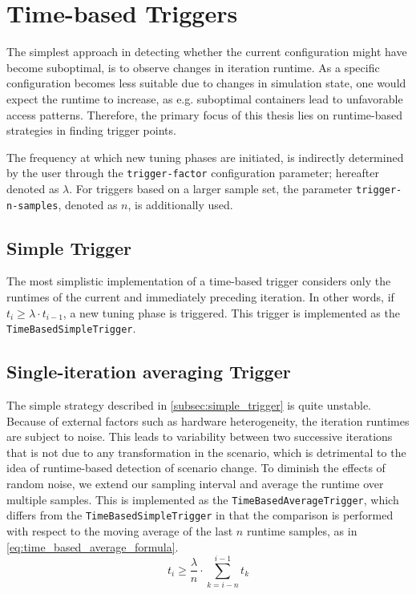 \section{Time-based Triggers}
\label{sec:time_base_triggers}
The simplest approach in detecting whether the current configuration might have become suboptimal, is to observe changes in iteration runtime. As a specific configuration becomes less suitable due to changes in simulation state, one would expect the runtime to increase, as e.g. suboptimal containers lead to unfavorable access patterns. Therefore, the primary focus of this thesis lies on runtime-based strategies in finding trigger points.

The frequency at which new tuning phases are initiated, is indirectly determined by the user through the \texttt{trigger-factor} configuration parameter; hereafter denoted as $\lambda$. For triggers based on a larger sample set, the parameter \texttt{trigger-n-samples}, denoted as $n$, is additionally used.

\subsection{Simple Trigger}
\label{subsec:simple_trigger}
The most simplistic implementation of a time-based trigger considers only the runtimes of the current and immediately preceding iteration. In other words, if $t_i \ge \lambda\cdot t_{i-1}$, a new tuning phase is triggered. This trigger is implemented as the \texttt{TimeBasedSimpleTrigger}.


\subsection{Single-iteration averaging Trigger}
The simple strategy described in \autoref{subsec:simple_trigger} is quite unstable. Because of external factors such as hardware heterogeneity, the iteration runtimes are subject to noise. This leads to variability between two successive iterations that is not due to any transformation in the scenario, which is detrimental to the idea of runtime-based detection of scenario change. To diminish the effects of random noise, we extend our sampling interval and average the runtime over multiple samples. This is implemented as the \texttt{TimeBasedAverageTrigger}, which differs from the \texttt{TimeBasedSimpleTrigger} in that the comparison is performed with respect to the  moving average of the last $n$ runtime samples, as in \eqref{eq:time_based_average_formula}.
\begin{equation}
	t_i \ge \frac{\lambda}{n}\cdot \sum_{k=i-n}^{i-1}t_{k}\label{eq:time_based_average_formula}
\end{equation}

